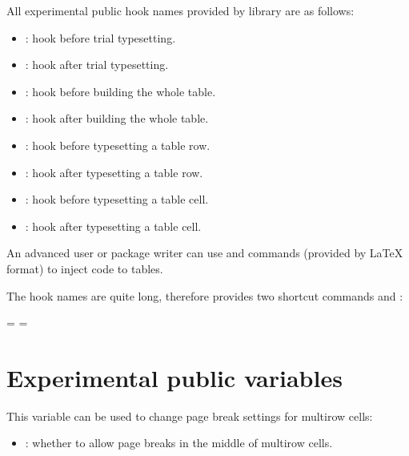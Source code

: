 \documentclass[oneside]{book}
\begin{document}
{All experimental public  hook names provided by  library are as follows:
\begin{itemize}[nosep]
  \item {}: hook before trial typesetting.
  \item {}: hook after trial typesetting.
  \item {}: hook before building the whole table.
  \item {}: hook after building the whole table.
  \item {}: hook before typesetting a table row.
  \item {}: hook after typesetting a table row.
  \item {}: hook before typesetting a table cell.
  \item {}: hook after typesetting a table cell.
\end{itemize}
An advanced user or package writer can use \CC{\AddToHook} and \CC{\AddToHookNext} commands
(provided by LaTeX format) to inject code to  tables.

The hook names are quite long, therefore  provides two shortcut commands
\CC{\AddToTblrHook} and \CC{\AddToTblrHookNext}:

\begin{codehigh}
 = 
 = 
\end{codehigh}

\section{Experimental public variables}
\label{sect:pubvar}

This variable can be used to change page break settings for multirow cells:
\begin{itemize}[nosep]
  \item \CC{\lTblrCellBreakBool}: whether to allow page breaks in the middle of multirow cells.
\end{itemize}

}
\end{document}
